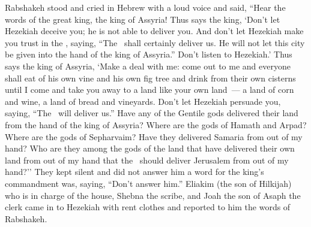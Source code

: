 \begin{inparaenum}
   Rabshakeh stood and cried in Hebrew with a loud voice and said, ``Hear the words of the great king, the king of Assyria!%
   Thus says the king, `Don't let Hezekiah deceive you; he is not able to deliver you.%
   And don't let Hezekiah make you trust in the \lord, saying, ``The \lord\ shall certainly deliver us. He will not let this city be given into the hand of the king of Assyria.''%
   Don't listen to Hezekiah.' Thus says the king of Assyria, `Make a deal with me: come out to me and everyone shall eat of his own vine and his own fig tree and drink from their own cisterns%
   until I come and take you away to a land like your own land~--- a land of corn and wine, a land of bread and vineyards.%
   Don't let Hezekiah persuade you, saying, ``The \lord\ will deliver us.'' Have any of the Gentile gods delivered their land from the hand of the king of Assyria?%
   Where are the gods of Hamath and Arpad? Where are the gods of Sepharvaim? Have they delivered Samaria from out of my hand?%
   Who are they among the gods of the land that have delivered their own land from out of my hand that the \lord\ should deliver Jerusalem from out of my hand?''%
   They kept silent and did not answer him a word for the king's commandment was, saying, ``Don't answer him.''%
   Eliakim (the son of Hilkijah) who is in charge of the house, Shebna the scribe, and Joah the son of Asaph the clerk came in to Hezekiah with rent clothes and reported to him the words of Rabshakeh.%
\end{inparaenum}
